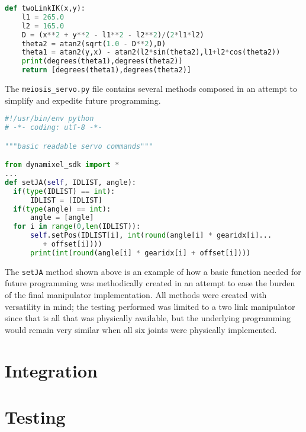\begin{lstlisting}[frame=line,language=Python,label=code:pyik,caption=twolink.py]
def twoLinkIK(x,y):
    l1 = 265.0
    l2 = 165.0
    D = (x**2 + y**2 - l1**2 - l2**2)/(2*l1*l2)
    theta2 = atan2(sqrt(1.0 - D**2),D)
    theta1 = atan2(y,x) - atan2(l2*sin(theta2),l1+l2*cos(theta2))
    print(degrees(theta1),degrees(theta2))
    return [degrees(theta1),degrees(theta2)]
\end{lstlisting}
The \texttt{meiosis\_servo.py} file contains several methods composed in an attempt to simplify and expedite future programming.
\begin{lstlisting}[frame=line,language=Python,label=code:pyservo,caption=meiosis\_servo.py]
#!/usr/bin/env python
# -*- coding: utf-8 -*-

"""basic readable servo commands"""

from dynamixel_sdk import *
...
def setJA(self, IDLIST, angle):
  if(type(IDLIST) == int):
      IDLIST = [IDLIST]
  if(type(angle) == int):
      angle = [angle]
  for i in range(0,len(IDLIST)):
      self.setPos(IDLIST[i], int(round(angle[i] * gearidx[i]...
         + offset[i])))
      print(int(round(angle[i] * gearidx[i] + offset[i])))
\end{lstlisting}
The \texttt{setJA} method shown above is an example of how a basic function needed for future programming was methodically created in an attempt to ease the burden of the final manipulator implementation. All methods were created with versatility in mind; the testing performed was limited to a two link manipulator since that is all that was physically available, but the underlying programming would remain very similar when all six joints were physically implemented.

\section*{Integration}

\section{Testing}


